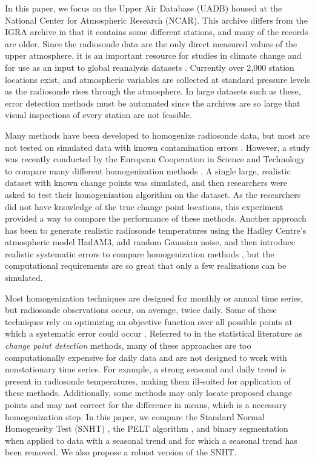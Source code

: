 \documentclass[12pt]{article}
\begin{document}
\begin{doublespacing}
In this paper, we  focus on the Upper Air Database (UADB) housed at the National Center for Atmospheric Research (NCAR). This archive differs from the IGRA archive in that it contains some different stations, and many of the records are older. Since the radiosonde data are the only direct measured values of the upper atmosphere, it is an important resource for studies in climate change \cite{elliott91, eskridge95} and for use as an input to global reanalysis datasets \cite{kalnay96, kanamitsu02}. Currently over 2,000 station locations exist, and atmospheric variables are collected at standard pressure levels as the radiosonde rises through the atmosphere. In large datasets such as these,  error detection methods must be automated since the archives are so large that visual inspections of every station are not feasible.

Many methods have been developed to homogenize radiosonde data, but most are not tested on simulated data with known contamination errors \cite{eskridge95, haimberger07, haimberger12, lanzante96, lanzante03, venema12}.  However, a study was recently conducted by the European Cooperation in Science and Technology to compare many different homogenization methods \cite{venema12}.  A single large, realistic dataset with known change points was simulated, and then researchers were asked to test their homogenization algorithm on the dataset.  As the researchers did not have knowledge of the true change point locations, this experiment provided a way to compare the performance of  these  methods.  Another approach has been to generate realistic radiosonde temperatures using the Hadley Centre's atmospheric model HadAM3, add random Gaussian noise, and then introduce realistic systematic errors to compare homogenization methods \cite{titchner09, thorne11}, but the computational requirements are so great that only a few  realizations can be simulated.

Most homogenization techniques are designed for monthly or annual time series, but radiosonde observations occur, on average, twice daily.  Some of these techniques rely on optimizing an objective function over all possible points at which a systematic error could occur  \cite{killick12, li14, lu10, scott74}.  Referred to in the statistical literature as \emph{change point detection} methods,   many of these approaches are too computationally expensive for daily data and are not designed to work with nonstationary time series.  For example, a strong seasonal and daily trend is present in radiosonde temperatures, making them ill-suited for application of these methods.  Additionally, some methods may only locate proposed change points and may not correct for the difference in means, which is a necessary homogenization step.  In this paper, we compare the Standard Normal Homogeneity Test (SNHT) \cite{alexandersson86}, the PELT algorithm \cite{killick12}, and binary segmentation \cite{scott74} when applied to data with a seasonal trend and for which a seasonal trend has been removed.  We also propose a robust version of the SNHT.


\end{doublespacing}
\end{document}
